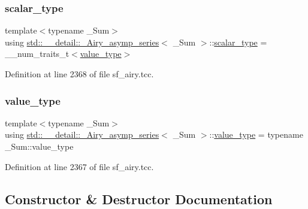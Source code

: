 \subsubsection{\texorpdfstring{scalar\+\_\+type}{scalar\_type}}
{\footnotesize\ttfamily template$<$typename \+\_\+\+Sum$>$ \\
using \hyperlink{classstd_1_1____detail_1_1__Airy__asymp__series}{std\+::\+\_\+\+\_\+detail\+::\+\_\+\+Airy\+\_\+asymp\+\_\+series}$<$ \+\_\+\+Sum $>$\+::\hyperlink{classstd_1_1____detail_1_1__Airy__asymp__series_ac2d0fa6d86d7a83c06dca057d0dfec3a}{scalar\+\_\+type} =  \+\_\+\+\_\+num\+\_\+traits\+\_\+t$<$\hyperlink{classstd_1_1____detail_1_1__Airy__asymp__series_a729a698f23629a2f94b6ef71f377efc5}{value\+\_\+type}$>$}



Definition at line 2368 of file sf\+\_\+airy.\+tcc.

\mbox{\label{classstd_1_1____detail_1_1__Airy__asymp__series_a729a698f23629a2f94b6ef71f377efc5}} 
\subsubsection{\texorpdfstring{value\+\_\+type}{value\_type}}
{\footnotesize\ttfamily template$<$typename \+\_\+\+Sum$>$ \\
using \hyperlink{classstd_1_1____detail_1_1__Airy__asymp__series}{std\+::\+\_\+\+\_\+detail\+::\+\_\+\+Airy\+\_\+asymp\+\_\+series}$<$ \+\_\+\+Sum $>$\+::\hyperlink{classstd_1_1____detail_1_1__Airy__asymp__series_a729a698f23629a2f94b6ef71f377efc5}{value\+\_\+type} =  typename \+\_\+\+Sum\+::value\+\_\+type}



Definition at line 2367 of file sf\+\_\+airy.\+tcc.



\subsection{Constructor \& Destructor Documentation}
\mbox{\label{classstd_1_1____detail_1_1__Airy__asymp__series_a2768b3e101876b969b606cbde8b2e133}} 
